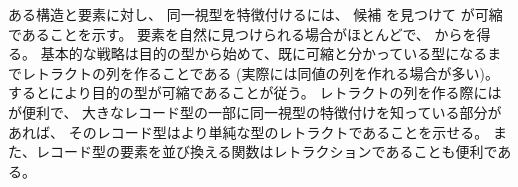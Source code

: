\documentclass[index]{subfiles}
\begin{document}





ある構造と要素に対し、
同一視型を特徴付けるには、
候補
を見つけて
が可縮であることを示す。
要素を自然に見つけられる場合がほとんどで、
からを得る。
基本的な戦略は目的の型から始めて、既に可縮と分かっている型になるまでレトラクトの列を作ることである
(実際には同値の列を作れる場合が多い)。
するとにより目的の型が可縮であることが従う。
レトラクトの列を作る際にはが便利で、
大きなレコード型の一部に同一視型の特徴付けを知っている部分があれば、
そのレコード型はより単純な型のレトラクトであることを示せる。
また、レコード型の要素を並び換える関数はレトラクションであることも便利である。


\end{document}
